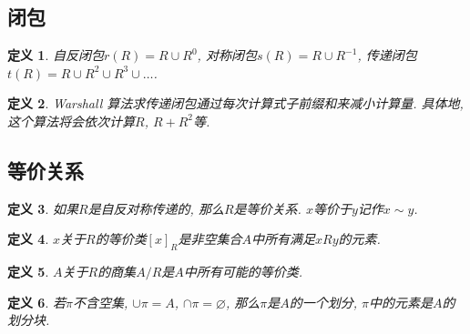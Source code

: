 \documentclass[UTF8,a4paper,11pt]{ctexart}
\newtheorem{definition}{定义}
\begin{document}
    \subsection{闭包}
      \begin{definition}
        自反闭包$r\left(R\right)=R\cup R^{0}$,
        对称闭包$s\left(R\right)=R\cup R^{-1}$,
        传递闭包$t\left(R\right)=R\cup R^{2}\cup R^{3}\cup \ldots $.
      \end{definition}
      \begin{definition}
        Warshall 算法求传递闭包通过每次计算式子前缀和来减小计算量. 
        具体地, 这个算法将会依次计算$R$, $R+R^{2}$等.
      \end{definition}
    \subsection{等价关系}
      \begin{definition}
        如果$R$是自反对称传递的, 那么$R$是等价关系.
        $x$等价于$y$记作$x\sim y$.
      \end{definition}
      \begin{definition}
        $x$关于$R$的等价类$[x]_R$是非空集合$A$中所有满足$xRy$的元素.
      \end{definition}
      \begin{definition}
        $A$关于$R$的商集$A / R$是$A$中所有可能的等价类.
      \end{definition}
      \begin{definition}
        若$\pi$不含空集, $\cup \pi=A$, $\cap \pi=\varnothing $,
        那么$\pi$是$A$的一个划分, $\pi$中的元素是$A$的划分块.
      \end{definition}
\end{document}
